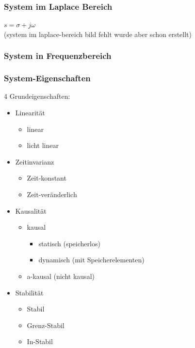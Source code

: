 \documentclass{article}
\begin{document}
\subsubsection*{System im Laplace Bereich}
$s=\sigma+j\omega$ \\
(system im laplace-bereich bild fehlt wurde aber schon erstellt)

\subsubsection*{System in Frequenzbereich}

\subsubsection*{System-Eigenschaften}
4 Grundeigenschaften:
\begin{itemize}
    \item Linearität
    \begin{itemize}
        \item linear
        \item licht linear
    \end{itemize}
    
    \item Zeitinvarianz
    \begin{itemize}
        \item Zeit-konstant
        \item Zeit-veränderlich
    \end{itemize}
    
    \item Kausalität
    \begin{itemize}
        \item kausal
        \begin{itemize}
            \item statisch (speicherlos)
            \item dynamisch (mit Speicherelementen)
        \end{itemize}
        \item a-kausal (nicht kausal)
    \end{itemize}
    
    \item Stabilität
    \begin{itemize}
        \item Stabil
        \item Grenz-Stabil
        \item In-Stabil
    \end{itemize}
\end{itemize}
\end{document}
